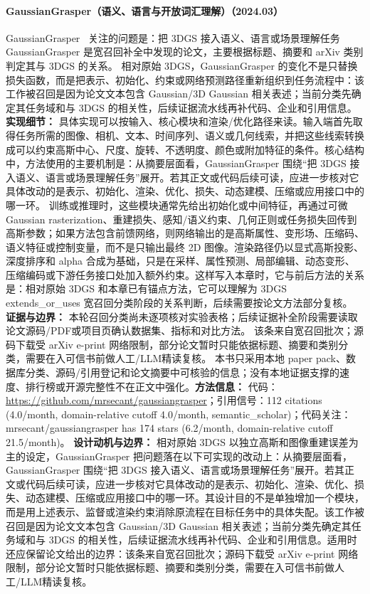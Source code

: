 \paragraph{GaussianGrasper（语义、语言与开放词汇理解）（2024.03）}
GaussianGrasper~\cite{2403_09637} 关注的问题是：把 3DGS 接入语义、语言或场景理解任务 GaussianGrasper 是宽召回补全中发现的论文，主要根据标题、摘要和 arXiv 类别判定其与 3DGS 的关系。
相对原始 3DGS，GaussianGrasper 的变化不是只替换损失函数，而是把表示、初始化、约束或网络预测路径重新组织到任务流程中：该工作被召回是因为论文文本包含 Gaussian/3D Gaussian 相关表述；当前分类先确定其任务域和与 3DGS 的相关性，后续证据流水线再补代码、企业和引用信息。
\textbf{实现细节：} 具体实现可以按输入、核心模块和渲染/优化路径来读。输入端首先取得任务所需的图像、相机、文本、时间序列、语义或几何线索，并把这些线索转换成可以约束高斯中心、尺度、旋转、不透明度、颜色或附加特征的条件。核心结构中，方法使用的主要机制是：从摘要层面看，GaussianGrasper 围绕“把 3DGS 接入语义、语言或场景理解任务”展开。若其正文或代码后续可读，应进一步核对它具体改动的是表示、初始化、渲染、优化、损失、动态建模、压缩或应用接口中的哪一环。 训练或推理时，这些模块通常先给出初始化或中间特征，再通过可微 Gaussian rasterization、重建损失、感知/语义约束、几何正则或任务损失回传到高斯参数；如果方法包含前馈网络，则网络输出的是高斯属性、变形场、压缩码、语义特征或控制变量，而不是只输出最终 2D 图像。渲染路径仍以显式高斯投影、深度排序和 alpha 合成为基础，只是在采样、属性预测、局部编辑、动态变形、压缩编码或下游任务接口处加入额外约束。这样写入本章时，它与前后方法的关系是：相对原始 3DGS 和本章已有锚点方法，它可以理解为 3DGS extends\_or\_uses 宽召回分类阶段的关系判断，后续需要按论文方法部分复核。
\textbf{证据与边界：} 本轮召回分类尚未逐项核对实验表格；后续证据补全阶段需要读取论文源码/PDF或项目页确认数据集、指标和对比方法。 该条来自宽召回批次；源码下载受 arXiv e-print 网络限制，部分论文暂时只能依据标题、摘要和类别分类，需要在入可信书前做人工/LLM精读复核。 本书只采用本地 paper pack、数据库分类、源码/引用登记和论文摘要中可核验的信息；没有本地证据支撑的速度、排行榜或开源完整性不在正文中强化。\textbf{方法信息：} 代码：\url{https://github.com/mrsecant/gaussiangrasper}；引用信号：112 citations (4.0/month, domain-relative cutoff 4.0/month, semantic\_scholar)；代码关注：mrsecant/gaussiangrasper has 174 stars (6.2/month, domain-relative cutoff 21.5/month)。
\textbf{设计动机与边界：} 相对原始 3DGS 以独立高斯和图像重建误差为主的设定，GaussianGrasper 把问题落在以下可实现的改动上：从摘要层面看，GaussianGrasper 围绕“把 3DGS 接入语义、语言或场景理解任务”展开。若其正文或代码后续可读，应进一步核对它具体改动的是表示、初始化、渲染、优化、损失、动态建模、压缩或应用接口中的哪一环。其设计目的不是单独增加一个模块，而是用上述表示、监督或渲染约束消除原流程在目标任务中的具体失配。该工作被召回是因为论文文本包含 Gaussian/3D Gaussian 相关表述；当前分类先确定其任务域和与 3DGS 的相关性，后续证据流水线再补代码、企业和引用信息。适用时还应保留论文给出的边界：该条来自宽召回批次；源码下载受 arXiv e-print 网络限制，部分论文暂时只能依据标题、摘要和类别分类，需要在入可信书前做人工/LLM精读复核。
